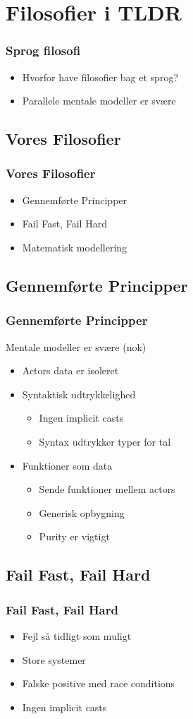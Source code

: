 \section{Filosofier i TLDR}
\begin{frame}
	\frametitle{Sprog filosofi}
	\begin{itemize}
		\item Hvorfor have filosofier bag et sprog?
		\item Parallele mentale modeller er svære
	\end{itemize}
\end{frame}
\subsection{Vores Filosofier}
\begin{frame}
	\frametitle{Vores Filosofier}
	\begin{itemize}
		\item Gennemførte Principper
		\item Fail Fast, Fail Hard
		\item Matematisk modellering
	\end{itemize}
\end{frame}
\subsection{Gennemførte Principper}
\begin{frame}
	\frametitle{Gennemførte Principper}
	Mentale modeller er svære (nok)
	\begin{itemize}
		\item Actors data er isoleret
		\item Syntaktisk udtrykkelighed
		\begin{itemize}
			\item Ingen implicit casts
			\item Syntax udtrykker typer for tal
		\end{itemize}
    		\item Funktioner som data
		\begin{itemize}
			\item Sende funktioner mellem actors
			\item Generisk opbygning
			\item Purity er vigtigt
		\end{itemize}
	\end{itemize}
\end{frame}
\subsection{Fail Fast, Fail Hard}
\begin{frame}
	\frametitle{Fail Fast, Fail Hard}
	\begin{itemize}
		\item Fejl så tidligt som muligt
		\item Store systemer
		\item Falske positive med race conditions
		\item Ingen implicit casts
	\end{itemize}
\end{frame}
